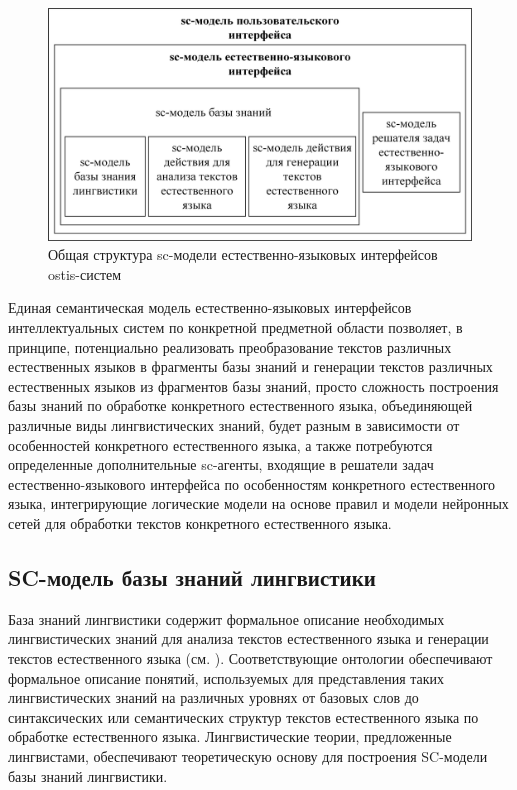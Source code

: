 \begin{figure}[H]
	\includegraphics[scale=0.8,width=1.0\textwidth]{images/part4/chapter_chinese/structure_interface.png}
	\caption{Общая структура sc-модели естественно-языковых интерфейсов ostis-систем}
	\label{fig:structure-sc-model-natural-interface}
\end{figure}

Единая семантическая модель естественно-языковых интерфейсов интеллектуальных систем по конкретной предметной области позволяет, в принципе, потенциально реализовать преобразование текстов различных естественных языков в фрагменты базы знаний и генерации текстов различных естественных языков из фрагментов базы знаний, просто сложность построения базы знаний по обработке конкретного естественного языка, объединяющей различные виды лингвистических знаний, будет разным в зависимости от особенностей конкретного естественного языка, а также потребуются определенные дополнительные sc-агенты, входящие в решатели задач естественно-языкового интерфейса по особенностям конкретного естественного языка, интегрирующие логические модели на основе правил и модели нейронных сетей для обработки текстов конкретного естественного языка.

\subsection{SC-модель базы знаний лингвистики}
База знаний лингвистики содержит формальное описание необходимых лингвистических знаний для анализа текстов естественного языка и генерации текстов естественного языка (см. ). Соответствующие онтологии обеспечивают формальное описание понятий, используемых для представления таких лингвистических знаний на различных уровнях от базовых слов до синтаксических или семантических структур текстов естественного языка по обработке естественного языка. Лингвистические теории, предложенные лингвистами, обеспечивают теоретическую основу для построения SC-модели базы знаний лингвистики. 

